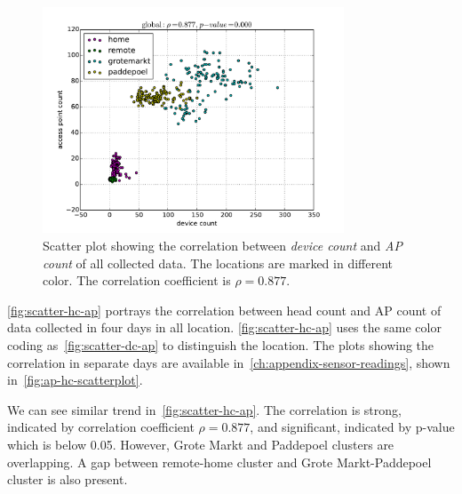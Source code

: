	\begin{figure}[h]
		\centering
		\includegraphics[width=0.8\textwidth]{./img/result/global-pr-vs-ap}
		\caption[Scatter plot showing the correlation of device count and \ac{AP} count.]
		{Scatter plot showing the correlation between \textit{device count} and \textit{\ac{AP} count} of all collected data. The locations are marked in different color. The correlation coefficient is $\rho=0.877$.}
		\label{fig:scatter-dc-ap}
	\end{figure}

	\autoref{fig:scatter-hc-ap} portrays the correlation between head count and \ac{AP} count of data collected in four days in all location. \autoref{fig:scatter-hc-ap} uses the same color coding as~\autoref{fig:scatter-dc-ap} to distinguish the location. The plots showing the correlation in separate days are available in~\autoref{ch:appendix-sensor-readings}, shown in~\autoref{fig:ap-hc-scatterplot}.
	
	We can see similar trend in~\autoref{fig:scatter-hc-ap}. The correlation is strong, indicated by correlation coefficient $\rho = 0.877$, and significant, indicated by p-value which is below 0.05. However, Grote Markt and Paddepoel clusters are overlapping. A gap between remote-home cluster and Grote Markt-Paddepoel cluster is also present.

